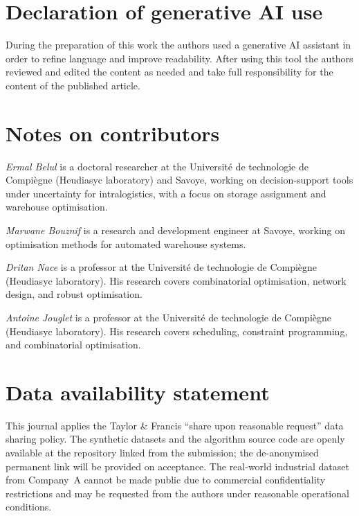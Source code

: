 \documentclass[]{interact}
\begin{document}
\section*{Declaration of generative AI use}
During the preparation of this work the authors used a generative AI assistant in order to refine language and improve readability. After using this tool the authors reviewed and edited the content as needed and take full responsibility for the content of the published article.

\section*{Notes on contributors}
\textit{Ermal Belul} is a doctoral researcher at the Universit\'{e} de technologie de Compi\`{e}gne (Heudiasyc laboratory) and Savoye, working on decision-support tools under uncertainty for intralogistics, with a focus on storage assignment and warehouse optimisation.

\textit{Marwane Bouznif} is a research and development engineer at Savoye, working on optimisation methods for automated warehouse systems.

\textit{Dritan Nace} is a professor at the Universit\'{e} de technologie de Compi\`{e}gne (Heudiasyc laboratory). His research covers combinatorial optimisation, network design, and robust optimisation.

\textit{Antoine Jouglet} is a professor at the Universit\'{e} de technologie de Compi\`{e}gne (Heudiasyc laboratory). His research covers scheduling, constraint programming, and combinatorial optimisation.

\section*{Data availability statement}
This journal applies the Taylor \& Francis ``share upon reasonable request'' data sharing policy. The synthetic datasets and the algorithm source code are openly available at the repository linked from the submission; the de-anonymised permanent link will be provided on acceptance. The real-world industrial dataset from Company~A cannot be made public due to commercial confidentiality restrictions and may be requested from the authors under reasonable operational conditions.



\end{document}
